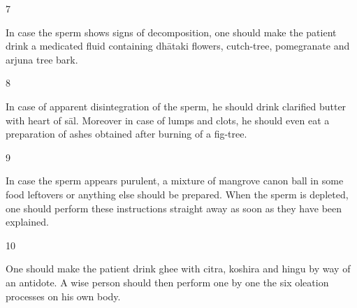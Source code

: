 \begin{translation}
 \item[7]
 
  In case the sperm shows signs of decomposition, one should make the patient 
  drink a medicated fluid containing dhātaki flowers, cutch-tree, pomegranate 
  and arjuna tree bark.
 
 \item[8]
 
  In case of apparent disintegration of the sperm, he should drink clarified butter 
  with heart of sāl. Moreover in case of lumps and clots, he should even eat a 
  preparation of ashes obtained after burning of a fig-tree.
 
 \item[9]
 
  In case the sperm appears purulent, a mixture of mangrove canon ball in some 
  food leftovers or anything else should be prepared. When the sperm is 
  depleted, one should perform these instructions straight away as soon as they 
  have been explained.
 
 \item[10]
 
  One should make the patient drink ghee with citra, koshira and hingu by way of 
  an antidote. A wise person should then perform one by one the six oleation 
  processes on his own body.   
    
\end{translation}